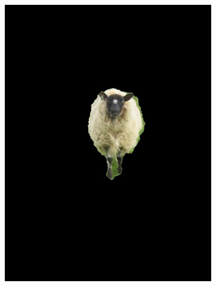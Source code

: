 \documentclass[a4paper,11]{article}
\begin{document}
\begin{center}
\begin{figure}[H]
\begin{subfigure}{.33\textwidth}
    \end{subfigure}
    \begin{subfigure}{0.33\textwidth}
      \centering
      \includegraphics[width=0.9\linewidth]{results/sheep}
   \end{subfigure}\\
    \vspace{1em}
    

\end{figure}
\end{center}
\end{document}
